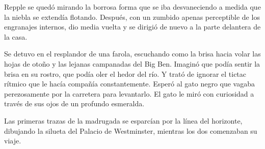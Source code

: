 {Repple se quedó mirando la borrosa forma que se iba desvaneciendo a
	medida que la niebla se extendía flotando. Después, con un zumbido
	apenas perceptible de los engranajes internos, dio media vuelta y se
dirigió de nuevo a la parte delantera de la casa.}

{Se detuvo en el resplandor de una farola, escuchando como la brisa
	hacia volar las hojas de otoño y las lejanas campanadas del Big Ben.
	Imaginó que podía sentir la brisa en su rostro, que podía oler el hedor
	del río. Y trató de ignorar el tictac rítmico que le hacía compañía
	constantemente. Esperó al gato negro que vagaba perezosamente por la
	carretera para levantarlo. El gato le miró con curiosidad a través de
sus ojos de un profundo esmeralda.}

{Las primeras trazas de la madrugada se esparcían por la línea del
	horizonte, dibujando la silueta del Palacio de Westminster, mientras los
dos comenzaban su viaje.}
